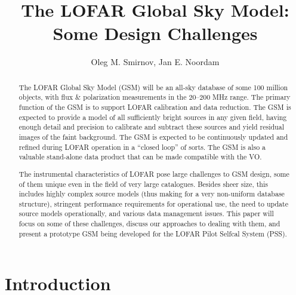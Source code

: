\documentclass[11pt,twoside]{article}  %
\begin{document}

\title{The LOFAR Global Sky Model: Some Design Challenges}

\author{Oleg M. Smirnov, Jan E. Noordam}





\begin{abstract}          

The LOFAR Global Sky Model (GSM) will be an all-sky database of some 100
million objects, with flux \& polarization measurements in the 20--200 MHz
range. The primary function of the GSM is to support LOFAR calibration and data
reduction. The GSM is expected to provide a model of all sufficiently  bright
sources in any given field, having enough detail and precision to calibrate and
subtract these sources and yield residual images of the faint background. The
GSM is expected to be continuously updated and refined during LOFAR operation
in a ``closed loop'' of sorts. The GSM is also a valuable stand-alone data
product that can be made compatible with the VO.

The instrumental characteristics of LOFAR pose large challenges to GSM design,
some of them unique even in the field of very large catalogues. Besides sheer
size, this includes highly complex source models (thus making for a very
non-uniform database structure), stringent performance requirements for
operational use, the need to update source models operationally, and various
data management issues. This paper will focus on some of these challenges,
discuss our approaches to dealing with them, and present a prototype GSM being
developed for the LOFAR Pilot Selfcal System (PSS).

\end{abstract}

\section{Introduction}
\end{document}
